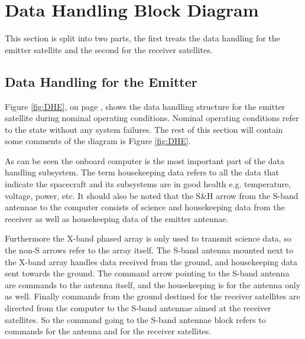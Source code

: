\section{Data Handling Block Diagram}
\label{DHBD}

This section is split into two parts, the first treats the data handling for the emitter satellite and the second for the receiver satellites.

\subsection{Data Handling for the Emitter}
\label{DataHandlingEmitter}

Figure \ref{fig:DHE}, on page \pageref{fig:DHE}, shows the data handling structure for the emitter satellite during nominal operating conditions. Nominal operating conditions refer to the state without any system failures. The rest of this section will contain some comments of the diagram is Figure \ref{fig:DHE}.

As can be seen the onboard computer is the most important part of the data handling subsystem. The term housekeeping data refers to all the data that indicate the spacecraft and its subsystems are in good health e.g. temperature, voltage, power, etc. It should also be noted that the S\&H arrow from the S-band antennae to the computer consists of science and housekeeping data from the receiver as well as housekeeping data of the emitter antennae. 

Furthermore the X-band phased array is only used to transmit science data, so the non-S arrows refer to the array itself. The S-band antenna mounted next to the X-band array handles data received from the ground, and housekeeping data sent towards the ground. The command arrow pointing to the S-band antenna are commands to the antenna itself, and the housekeeping is for the antenna only as well. Finally commands from the ground destined for the receiver satellites are directed from the computer to the S-band antennae aimed at the receiver satellites. So the command going to the S-band antennae block refers to commands for the antenna and for the receiver satellites.

